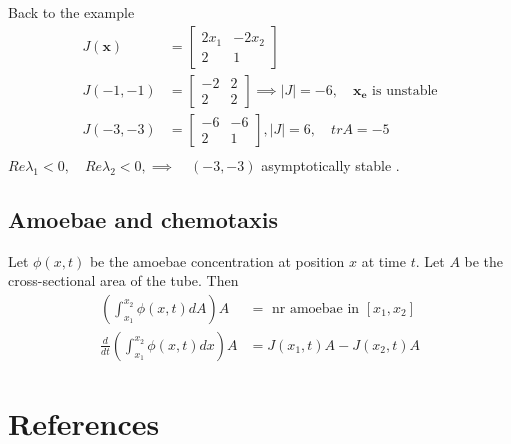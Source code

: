 \documentclass{article}
\theoremstyle{remark}
\begin{document}
  Back to the example  \[
    \begin{split}
  J\left( \mathbf{x} \right)  & = \begin{bmatrix} 
  2x_{1}  &  -2x_{2} \\
  2 &  1
  \end{bmatrix}  \\
  J\left( -1, -1 \right) &=  \begin{bmatrix} 
  -2  &  2 \\
  2  &  2
  \end{bmatrix} 
  \implies  \left\lvert J \right\rvert  = -6 , \quad  \mathbf{x_{e}} \text{ is unstable} 
   \\
   J\left( -3, -3 \right) &=  \begin{bmatrix} 
   -6  &  -6 \\
   2  &  1
   \end{bmatrix} 
   , \left\lvert J \right\rvert  = 6, \quad  tr A = -5 
    \\
    \end{split} 
  \] 
  $Re \lambda _{1} < 0,\quad   Re \lambda _{2} < 0, \implies  \quad  \left( -3, -3 \right)  $  asymptotically stable .

  \subsection{Amoebae and chemotaxis}%
  \label{sub:amoebae_and_cheotaxis}
  
  Let $\phi \left( x,t \right)$ be the amoebae concentration at position $x$ at time $t$. Let $A$ be the cross-sectional area of the tube. Then \[
    \begin{split}
  \left( \int_{x_{1}}^{x_{2}}  \phi \left( x,t \right) dA \right) A  & = \text{ nr amoebae in } \left[ x_{1}, x_{2} \right] \\
  \frac{d }{d t} \left( \int_{x_{1}}^{x_{2}}  \phi \left( x,t \right) dx \right)A  & = J\left( x_{1}, t \right) A - J \left( x_{2}, t \right) A 
    \end{split} 
  \]  
  

\newpage

\section{References}%
\label{sec:references}


  


\end{document}
